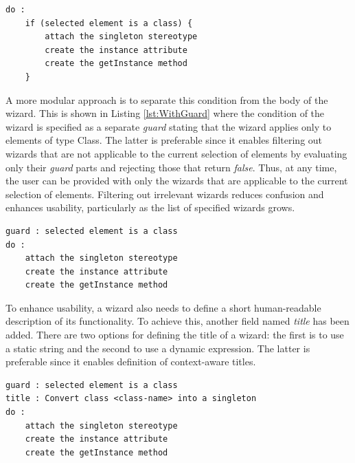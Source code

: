 \begin{lstlisting}[basicstyle=\ttfamily\footnotesize, flexiblecolumns=true, numbers=none, nolol=true, caption=The wizard of Listing \ref{lst:Basic} enhanced with an $if$ condition, label=lst:WithoutGuard, language=EWL, tabsize=2]
do : 
	if (selected element is a class) {
		attach the singleton stereotype
		create the instance attribute
		create the getInstance method
	}
\end{lstlisting}

A more modular approach is to separate this condition from the body of the wizard. This is shown in Listing \ref{lst:WithGuard} where the condition of the wizard is specified as a separate \emph{guard} stating that the wizard applies only to elements of type Class. The latter is preferable since it enables filtering out wizards that are not applicable to the current selection of elements by evaluating only their \emph{guard} parts and rejecting those that return \emph{false}. Thus, at any time, the user can be provided with only the wizards that are applicable to the current selection of elements. Filtering out irrelevant wizards reduces confusion and enhances usability, particularly as the list of specified wizards grows.

\begin{lstlisting}[basicstyle=\ttfamily\footnotesize, flexiblecolumns=true, numbers=none, nolol=true, caption=The wizard of Listing \ref{lst:WithoutGuard} with an explicit $guard$ instead of the $if$ condition, label=lst:WithGuard, language=EWL, tabsize=2]
guard : selected element is a class
do : 
	attach the singleton stereotype
	create the instance attribute
	create the getInstance method
\end{lstlisting}

To enhance usability, a wizard also needs to define a short human-readable description of its functionality. To achieve this, another field named \emph{title} has been added. There are two options for defining the title of a wizard: the first is to use a static string and the second to use a dynamic expression. The latter is preferable since it enables definition of context-aware titles.

\begin{lstlisting}[basicstyle=\ttfamily\footnotesize, flexiblecolumns=true, numbers=none, nolol=true, caption=The wizard of Listing \ref{lst:WithGuard} enhanced with a $title$ part, label=lst:FinalForm, language=EWL, tabsize=2]
guard : selected element is a class
title : Convert class <class-name> into a singleton
do : 
	attach the singleton stereotype
	create the instance attribute
	create the getInstance method
\end{lstlisting}

